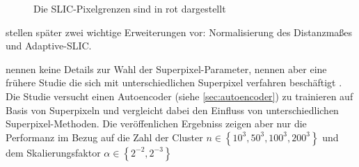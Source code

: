 \begin{figure}
    \centering
    \caption{Die SLIC-Pixelgrenzen sind in rot dargestellt }
    \label{fig:slic_parameters}
\end{figure}

\citeauthor{AchantaSLICSuperpixelsCompared2012} stellen später zwei wichtige Erweiterungen vor:
Normalisierung des Distanzmaßes und Adaptive-SLIC.

\citeauthor{ChenConvolutionalNeuralNetworks2017a} nennen keine Details zur Wahl
der Superpixel-Parameter, nennen aber eine frühere Studie die sich mit unterschiedlichen 
Superpixel verfahren beschäftigt \parencite{ChenPageSegmentationHistorical2016}.
Die Studie versucht einen Autoencoder (siehe \ref{sec:autoencoder}) zu trainieren auf Basis von Superpixeln und vergleicht dabei den Einfluss von unterschiedlichen Superpixel-Methoden. Die veröffenlichen Ergebniss zeigen aber nur die Performanz im Bezug
auf die Zahl der Cluster \(n \in \left\{10^3, 50^3, 100^3, 200^3\right\}\) und dem Skalierungsfaktor \(\alpha \in \left\{2^{-2}, 2^{-3}\right\}\)

